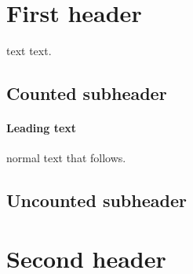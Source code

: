\documentclass{article}
\begin{document}
\tableofcontents
\section{First header}
text text.
\subsection{Counted subheader}
\paragraph{Leading text}
normal text that follows.
\subsection*{Uncounted subheader}
\section{Second header}
\end{document}
